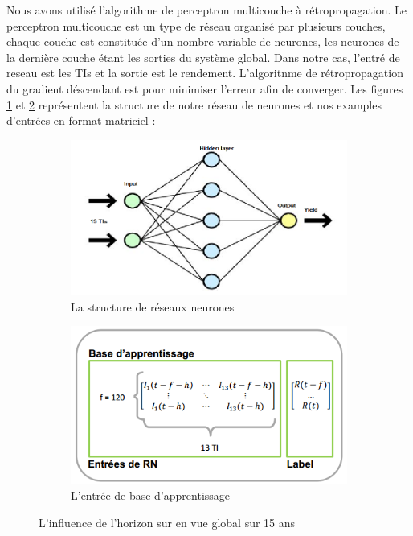 Nous avons utilisé l'algorithme de perceptron multicouche à rétropropagation. Le perceptron multicouche est un type de réseau organisé par plusieurs couches, chaque couche est constituée d'un nombre variable de neurones, les neurones de la dernière couche étant les sorties du système global. Dans notre cas, l'entré de reseau est les TIs et la sortie est le rendement. L'algoritnme de rétropropagation du gradient déscendant est pour minimiser l'erreur afin de converger. Les figures \ref{fig:RN} et \ref{fig:base} représentent la structure de notre réseau de neurones et nos examples d'entrées en format matriciel :\\

\begin{figure}[H]
	\centering
	\begin{subfigure}{.5\textwidth}
	\includegraphics[width=.9\linewidth, scale=0.2]
	{plot/RN.png}
	\caption{La structure de réseaux neurones}
	\label{fig:RN}
	\end{subfigure}%
	\begin{subfigure}{.5\textwidth}
	\centering
	\includegraphics[width=.9\linewidth, scale=0.2]
	{plot/base.png}
	\caption{L'entrée de base d'apprentissage}
	\label{fig:base}
	\end{subfigure}
\caption{L'influence de l'horizon sur en vue global sur 15 ans}
\label{fig:ME_Trainingset}
\end{figure}

